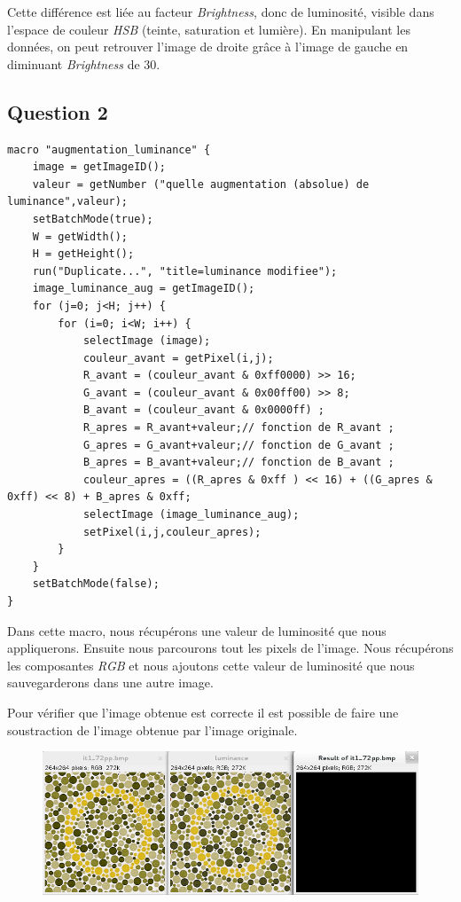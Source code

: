 \documentclass[a4paper,12pt]{report}
\begin{document}
Cette différence est liée au facteur \textit{Brightness}, donc de luminosité, visible dans l'espace de couleur \textit{HSB} (teinte, saturation et lumière). En manipulant les données, on peut retrouver l'image de droite grâce à l'image de gauche en diminuant \textit{Brightness} de 30. 

\newpage

\subsection*{Question 2}
 
\begin{lstlisting}[style=Java,caption={Code question 2},label=lst:question 2]
macro "augmentation_luminance" {
	image = getImageID();
	valeur = getNumber ("quelle augmentation (absolue) de luminance",valeur);
	setBatchMode(true);
	W = getWidth();
	H = getHeight();
	run("Duplicate...", "title=luminance modifiee");
	image_luminance_aug = getImageID();
	for (j=0; j<H; j++) {
		for (i=0; i<W; i++) {
			selectImage (image);
			couleur_avant = getPixel(i,j);
			R_avant = (couleur_avant & 0xff0000) >> 16;
			G_avant = (couleur_avant & 0x00ff00) >> 8;
			B_avant = (couleur_avant & 0x0000ff) ;
			R_apres = R_avant+valeur;// fonction de R_avant ;
			G_apres = G_avant+valeur;// fonction de G_avant ;
			B_apres = B_avant+valeur;// fonction de B_avant ;
			couleur_apres = ((R_apres & 0xff ) << 16) + ((G_apres & 0xff) << 8) + B_apres & 0xff;
			selectImage (image_luminance_aug);
			setPixel(i,j,couleur_apres);
		}
	}
	setBatchMode(false);
}
\end{lstlisting}

Dans cette macro, nous récupérons une valeur de luminosité que nous appliquerons. Ensuite nous parcourons tout les pixels de l'image. Nous récupérons les composantes \textit{RGB} et nous ajoutons cette valeur de luminosité que nous sauvegarderons dans une autre image.

Pour vérifier que l'image obtenue est correcte il est possible de faire une soustraction de l'image obtenue par l'image originale.

\begin{figure}[!ht]
	\center
	\includegraphics[scale=0.5]{image/q2.png}
\end{figure} 
\end{document}
